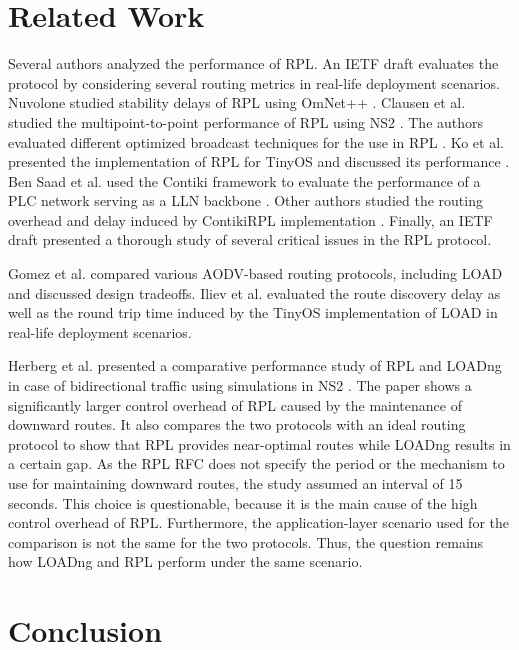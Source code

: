 \documentclass[conference,10pt,a4paper]{IEEEtran}
\begin{document}
\section{Related Work}
\label{related-work}


Several authors analyzed the performance of RPL. An IETF draft
\cite{rpl-performance-draft} evaluates the protocol by considering several
routing metrics in real-life deployment scenarios. 
Nuvolone studied stability delays of RPL using OmNet++ \cite{nuvolone-thesis}. 
Clausen et al. studied the multipoint-to-point performance of RPL using NS2
\cite{clausen-m2p}. 
The authors \cite{clausen-optimized-broadcast} evaluated different optimized
broadcast techniques for the use in RPL
\cite{clausen-optimized-broadcast}. 
Ko et al. presented the implementation of RPL for TinyOS and discussed its
performance \cite{rpl-tiny}. 
Ben Saad et al. used the
Contiki framework to evaluate the performance of a PLC network serving as a LLN
backbone \cite{rpl-two-cases-studies}. 
Other authors studied the routing overhead and delay induced by ContikiRPL
implementation
\cite{rpl-performance}. Finally, an IETF draft \cite{rpl-experiences-draft} presented a thorough study of
several critical issues in the RPL protocol. 

Gomez et al. \cite{aodv-based-routing} compared various AODV-based routing
protocols, including LOAD and discussed design tradeoffs. 
Iliev et al. \cite{iliev-report} evaluated the route discovery delay as well as
the round trip time induced by the TinyOS implementation of LOAD in
real-life deployment scenarios. 


Herberg et al. presented a comparative performance study of RPL and LOADng in
case of bidirectional traffic using simulations in NS2
\cite{rpl-load-clausen-paper}. The paper shows a significantly larger control
overhead of RPL caused by the maintenance of downward routes. It also compares
the two protocols with an ideal routing protocol to show that RPL provides
near-optimal routes while LOADng results in a certain gap. 
As the RPL RFC does not specify the period or the mechanism to use for
maintaining downward routes, the study assumed an interval of 15 seconds. 
This choice is questionable, because it is the main cause of the high control
overhead of RPL. Furthermore, the application-layer scenario used for the
comparison is not the same for the two protocols. Thus, the question remains how
LOADng and RPL perform under the same scenario. 

\section{Conclusion}
\label{conclusion}
\end{document}
